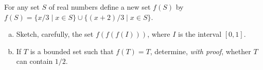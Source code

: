 For any set $S$ of real numbers define a new set $f(S)$ by $f(S) = \lbrace x/3
\mid x \in S \rbrace \cup \lbrace (x + 2)/3 \mid x \in S \rbrace$.

\begin{enumerate}[(a)]

\item Sketch, carefully, the set $f(f(f(I)))$, where $I$ is the interval $[0,
      1]$.
\item If $T$ is a bounded set such that $f(T) = T$, determine, {\it with
      proof}, whether $T$ can contain $1/2$.

\end{enumerate}
